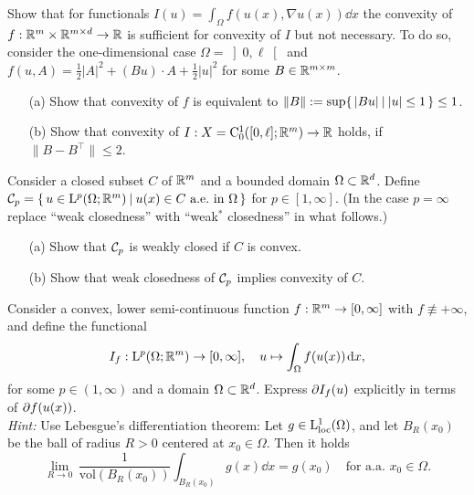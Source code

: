 \documentclass[12pt,a4paper]{article}
\begin{document}

\setcounter{AUFGABE}{18}


 Show that for
functionals $I(u)= 
\int_\Omega f(u(x),\nabla u(x))\dd x$ the convexity of $f:{\mathbb R}^m\times
{\mathbb R}^{m\times d} \to {\mathbb R}$ is sufficient for convexity of $I$ but not
necessary. 
To do so, consider the one-dimensional case $\Omega=\left]0,\ell\right[$ 
and $f(u,A)=\frac 12 |A|^2
+(Bu)\cdot A+\frac12|u|^2$ for some  $B\in {\mathbb R}^{m \times m}$. 

\begin{itemize}
    \item[(a)] Show that convexity of $f$ is equivalent
to $\|B\|:=\sup \{\, |Bu| \: | \:  |u|\leq 1 \,\} \leq 1$.
\item[(b)] Show that convexity of $I:X={\mathrm C}^1_0([0,\ell];{\mathbb R}^m)\to {\mathbb R}$ holds, if 
$\| B{-}B^\top\| \leq 2$. 
\end{itemize}

 Consider a closed subset $C$ of ${\mathbb R}^m$ and
a bounded domain $\Omega\subset {\mathbb R}^d$. 
Define ${\mathcal C}_p=\{\, u\in {\mathrm L}^p(\Omega;{\mathbb R}^m) \: | \:  u(x) \in C \text{
    a.e.\ in  } \Omega  \,\}$ for $p\in [1,\infty]$. (In the case
$p=\infty$ replace ``weak closedness'' with ``weak$^*$ closedness'' in what follows.) 

\begin{itemize}
    \item[(a)] Show that ${\mathcal C}_p$ is weakly closed if $C$ is convex. 

\item[(b)] Show that weak closedness of ${\mathcal C}_p$ implies convexity of $C$. 
\end{itemize}


Consider a convex, lower semi-continuous function $f:{\mathbb R}^m \to [0,\infty]$ with $f\not\equiv +\infty$, 
and
define the functional 
\[
I_f:{\mathrm L}^p(\Omega;{\mathbb R}^m) \to [0,\infty], \quad u \mapsto \int_\Omega f(u(x))
\;\!\mathrm{d} x ,
\] 
for some $p\in {(1,\infty)}$ and a domain $\Omega\subset{\mathbb R}^d$. Express $\partial I_f(u)$ explicitly in terms
of $\partial f(u(x))$.
\\
\textit{Hint:}
Use Lebesgue's differentiation theorem: 
Let $g\in{\mathrm L}_{\mathrm{loc}}^1(\Omega)$, and let $B_R(x_0)$ be the ball of radius $R>0$ centered at $x_0\in\Omega$.
Then it holds
\[
\lim_{R\to 0}\,\frac{1}{\mathrm{vol}(B_R(x_0))}\int_{ B_R(x_0)} g(x)\dd x
=g(x_0)
\quad
\text{for a.a.~} x_0\in\Omega.
\]
\end{document}
